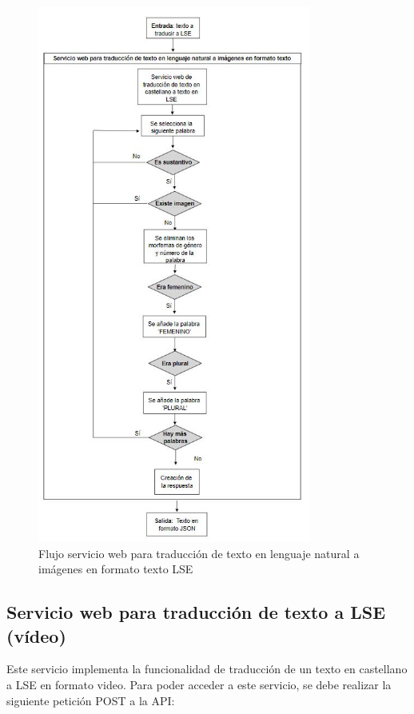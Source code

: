 \begin{figure}[]
	\centering
	\includegraphics[width=0.8\textwidth]{Imagenes/Fuentes/Text2LSE/FlujoTextoImagenTexto.jpg}
	\caption{ Flujo servicio web para traducción de texto en lenguaje natural a imágenes en formato texto LSE}
	\label {fig: imgFlujoTextoImagenTextoText2LSE}
\end{figure}


\subsection{Servicio web para traducción de texto a LSE (vídeo)}

Este servicio implementa la funcionalidad de traducción de un texto en castellano a LSE en formato video.  Para poder acceder a este servicio, se debe realizar la siguiente petición POST a la API:\\

